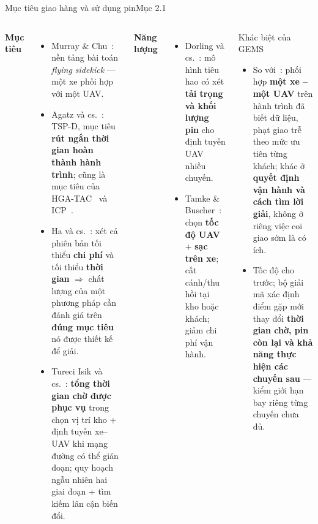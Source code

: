 \documentclass[aspectratio=169,10pt,t,xcolor={table}]{beamer}
\newcommand{\src}[1]{\hfill{\normalfont\footnotesize\color{white!62!navy}#1}}  %
\newcommand{\nv}[1]{{\color{navy}\bfseries #1}}
\begin{document}
\begin{frame}{Mục tiêu giao hàng và sử dụng pin\src{Mục 2.1}}
\begin{columns}[T,onlytextwidth]
\nv{Mục tiêu}
\begin{itemize}\footnotesize
\item Murray \& Chu~\cite{murray2015}: nền tảng bài toán \emph{flying sidekick} --- một xe phối hợp với một UAV.
\item Agatz và cs.~\cite{agatz2018}: TSP-D, mục tiêu \textbf{rút ngắn thời gian hoàn thành hành trình}; cũng là mục tiêu của HGA-TAC~\cite{hgatac2024} và ICP~\cite{lee2025}.
\item Ha và cs.~\cite{ha2020}: xét cả phiên bản tối thiểu \textbf{chi phí} và tối thiểu \textbf{thời gian} $\Rightarrow$ chất lượng của một phương pháp cần đánh giá trên \textbf{đúng mục tiêu} nó được thiết kế để giải.
\item Tureci Isik và cs.~\cite{tureci2026}: \textbf{tổng thời gian chờ được phục vụ} trong chọn vị trí kho + định tuyến xe--UAV khi mạng đường có thể gián đoạn; quy hoạch ngẫu nhiên hai giai đoạn + tìm kiếm lân cận biến đổi.
\end{itemize}
\nv{Năng lượng}
\begin{itemize}\footnotesize
\item Dorling và cs.~\cite{dorling2017}: mô hình tiêu hao có xét \textbf{tải trọng và khối lượng pin} cho định tuyến UAV nhiều chuyến.
\item Tamke \& Buscher~\cite{tamke}: chọn \textbf{tốc độ UAV} + \textbf{sạc trên xe}; cất cánh/thu hồi tại kho hoặc khách; giảm chi phí vận hành.
\end{itemize}
\vspace{2pt}
\begin{alertblock}{Khác biệt của GEMS}
\footnotesize
\begin{itemize}
\item So với~\cite{tureci2026}: phối hợp \textbf{một xe -- một UAV} trên hành trình đã biết dữ liệu, phạt giao trễ theo mức ưu tiên từng khách; khác ở \textbf{quyết định vận hành và cách tìm lời giải}, không ở riêng việc coi giao sớm là có ích.
\item Tốc độ cho trước; bộ giải mã xác định điểm gặp mới thay đổi \textbf{thời gian chờ, pin còn lại và khả năng thực hiện các chuyến sau} --- kiểm giới hạn bay riêng từng chuyến chưa đủ.
\end{itemize}
\end{alertblock}
\end{columns}
\end{frame}
\end{document}
